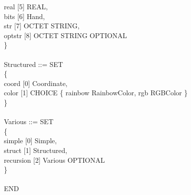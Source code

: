 \begin{ASNcode}
  real   [5] REAL,\\
  bits   [6] Hand,\\
  str    [7] OCTET STRING,\\
  optstr [8] OCTET STRING OPTIONAL\-\\
\}\\
\\
Structured ::= SET\\
\{\+\\
  coord [0] Coordinate,\\
  color [1] CHOICE \{ rainbow RainbowColor, rgb RGBColor \}\-\\
\}\\
\\
Various ::= SET\\
\{\+\\
  simple [0] Simple,\\
  struct [1] Structured,\\
  recursion [2] Various OPTIONAL\-\\
\}\\
\\
END
\end{ASNcode}
